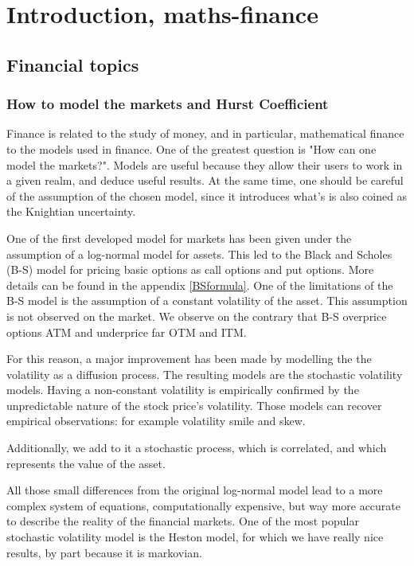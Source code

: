 \chapter{Introduction, maths-finance}

\section{Financial topics}




\subsection{How to model the markets and Hurst Coefficient}

Finance is related to the study of money, and in particular, mathematical finance to the models used in finance. One of the greatest question is "How can one model the markets?". Models are useful because they allow their users to work in a given realm, and deduce useful results. At the same time, one should be careful of the assumption of the chosen model, since it introduces what's is also coined as the Knightian uncertainty.

One of the first developed model for markets has been given under the assumption of a log-normal model for assets. This led to the Black and Scholes (B-S) model for pricing basic options as call options and put options. More details can be found in the appendix \ref{BSformula}. One of the limitations of the B-S model is the assumption of a constant volatility of the asset. This assumption is not observed on the market. We observe on the contrary that B-S overprice options ATM and underprice far OTM and ITM.

For this reason, a major improvement has been made by modelling the the volatility as a diffusion process. The resulting models are the stochastic volatility models. Having a non-constant volatility is empirically confirmed by the unpredictable nature of the stock price's volatility. Those models can recover empirical observations: for example volatility smile and skew. 

Additionally, we add to it a stochastic process, which is correlated, and which represents the value of the asset. 

All those small differences from the original log-normal model lead to a more complex system of equations, computationally expensive, but way more accurate to describe the reality of the financial markets. One of the most popular stochastic volatility model is the Heston model, for which we have really nice results, by part because it is markovian.

